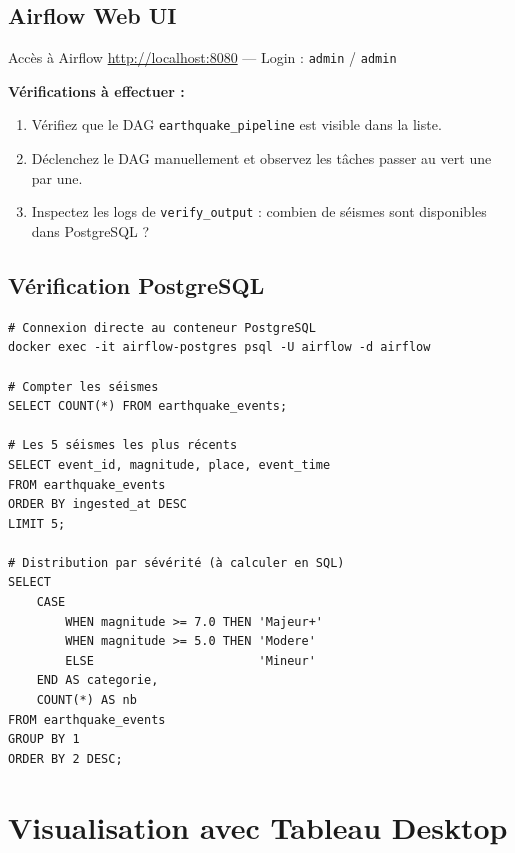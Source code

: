 \documentclass[12pt,a4paper]{article}
\begin{document}
\subsection{Airflow Web UI}

\begin{infobox}{Accès à Airflow}
  \url{http://localhost:8080} --- Login : \texttt{admin} / \texttt{admin}
\end{infobox}

\textbf{Vérifications à effectuer :}
\begin{enumerate}
  \item Vérifiez que le DAG \texttt{earthquake\_pipeline} est visible dans la liste.
  \item Déclenchez le DAG manuellement et observez les tâches passer au vert une par une.
  \item Inspectez les logs de \texttt{verify\_output} :
        combien de séismes sont disponibles dans PostgreSQL ?
\end{enumerate}

\subsection{Vérification PostgreSQL}

\begin{lstlisting}[style=bash, caption={Requêtes de vérification PostgreSQL}]
# Connexion directe au conteneur PostgreSQL
docker exec -it airflow-postgres psql -U airflow -d airflow

# Compter les séismes
SELECT COUNT(*) FROM earthquake_events;

# Les 5 séismes les plus récents
SELECT event_id, magnitude, place, event_time
FROM earthquake_events
ORDER BY ingested_at DESC
LIMIT 5;

# Distribution par sévérité (à calculer en SQL)
SELECT
    CASE
        WHEN magnitude >= 7.0 THEN 'Majeur+'
        WHEN magnitude >= 5.0 THEN 'Modere'
        ELSE                       'Mineur'
    END AS categorie,
    COUNT(*) AS nb
FROM earthquake_events
GROUP BY 1
ORDER BY 2 DESC;
\end{lstlisting}

\newpage

\section{Visualisation avec Tableau Desktop}
\end{document}
